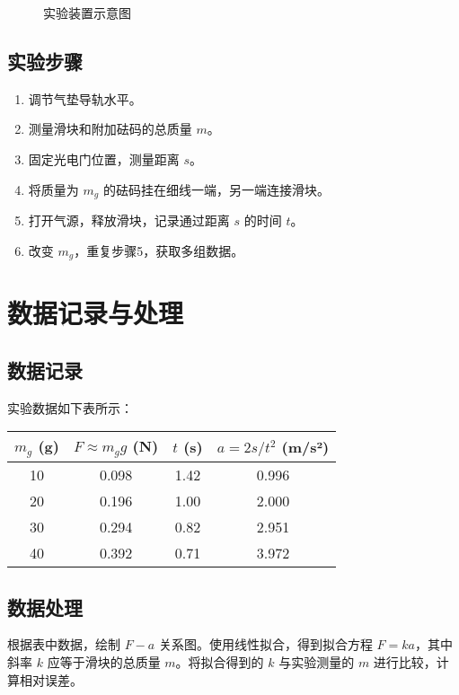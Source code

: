 \documentclass[12pt,a4paper]{article}
\begin{document}
\begin{figure}[htbp]
    \centering
    \caption{实验装置示意图}
    \label{fig:setup}
\end{figure}

\subsection{实验步骤}
\begin{enumerate}
    \item 调节气垫导轨水平。
    \item 测量滑块和附加砝码的总质量 $m$。
    \item 固定光电门位置，测量距离 $s$。
    \item 将质量为 $m_g$ 的砝码挂在细线一端，另一端连接滑块。
    \item 打开气源，释放滑块，记录通过距离 $s$ 的时间 $t$。
    \item 改变 $m_g$，重复步骤5，获取多组数据。
\end{enumerate}

\section{数据记录与处理}
\subsection{数据记录}
实验数据如下表所示：

\begin{center}
\begin{tabular}{|c|c|c|c|}
\hline
$m_g$ (g) & $F \approx m_g g$ (N) & $t$ (s) & $a = 2s/t^2$ (m/s²) \\
\hline
10 & 0.098 & 1.42 & 0.996 \\
20 & 0.196 & 1.00 & 2.000 \\
30 & 0.294 & 0.82 & 2.951 \\
40 & 0.392 & 0.71 & 3.972 \\
\hline
\end{tabular}
\end{center}

\subsection{数据处理}
根据表中数据，绘制 $F-a$ 关系图。使用线性拟合，得到拟合方程 $F = ka$，其中斜率 $k$ 应等于滑块的总质量 $m$。将拟合得到的 $k$ 与实验测量的 $m$ 进行比较，计算相对误差。
\end{document}
